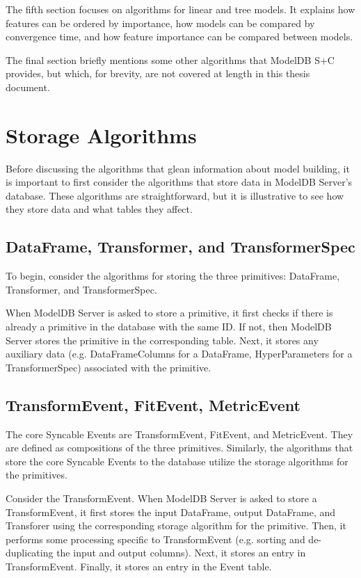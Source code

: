 The fifth section focuses on algorithms for linear and tree models. It explains
how features can be ordered by importance, how models can be compared by convergence time,
and how feature importance can be compared between models.

The final section briefly mentions some other algorithms that ModelDB S+C provides, but which,
for brevity, are not covered at length in this thesis document.

\section{Storage Algorithms}
Before discussing the algorithms that glean information about model building, it
is important to first consider the algorithms that store data in ModelDB Server's 
database. These algorithms are straightforward, but it is illustrative to see
how they store data and what tables they affect.

\subsection{DataFrame, Transformer, and TransformerSpec}
To begin, consider the algorithms for storing the three primitives: DataFrame, 
Transformer, and TransformerSpec.

When ModelDB Server is asked to store a primitive, it first checks if there is already
a primitive in the database with the same ID. If not, then ModelDB Server stores the primitive
in the corresponding table. Next, it stores any auxiliary data (e.g. DataFrameColumns for a DataFrame, 
HyperParameters for a TransformerSpec) associated with the primitive.

\subsection{TransformEvent, FitEvent, MetricEvent}
The core Syncable Events are TransformEvent, FitEvent, and MetricEvent. They
are defined as compositions of the three primitives. Similarly, the algorithms
that store the core Syncable Events to the database utilize the storage algorithms
for the primitives.

Consider the TransformEvent. When ModelDB Server is asked to store a TransformEvent, it
first stores the input DataFrame, output DataFrame, and Transforer using the corresponding
storage algorithm for the primitive. Then, it performs some processing specific to
TransformEvent (e.g. sorting and de-duplicating the input and output columns). Next,
it stores an entry in TransformEvent. Finally, it stores an entry in the Event table.

